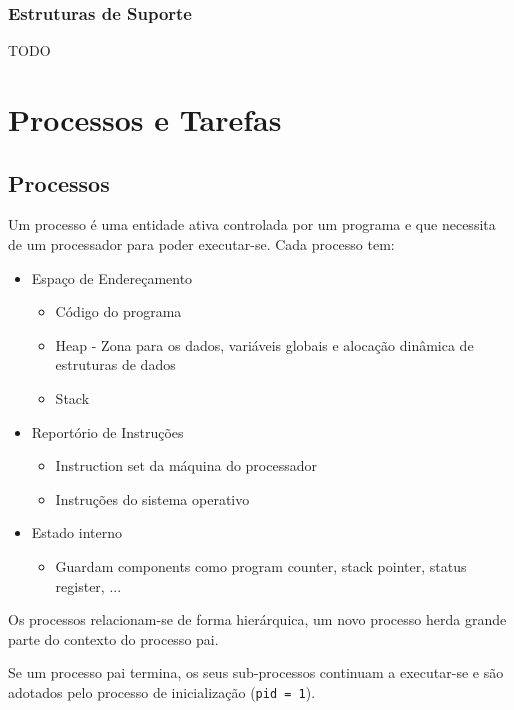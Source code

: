 \documentclass[11pt]{article}
\begin{document}
\subsubsection{Estruturas de Suporte}

TODO

\newpage

\section{Processos e Tarefas}

\subsection{Processos}

Um processo é uma entidade ativa controlada por um programa e que necessita de um processador para poder executar-se. Cada processo tem:
\begin{itemize}
    \item Espaço de Endereçamento
          \begin{itemize}
              \item Código do programa
              \item Heap - Zona para os dados, variáveis globais e alocação
                    dinâmica de estruturas de dados
              \item Stack
          \end{itemize}
    \item Reportório de Instruções
          \begin{itemize}
              \item Instruction set da máquina do processador
              \item Instruções do sistema operativo
          \end{itemize}
    \item Estado interno
          \begin{itemize}
              \item Guardam components como program counter, stack pointer, status register, ...
          \end{itemize}
\end{itemize}

Os processos relacionam-se de forma hierárquica, um novo processo herda grande parte do contexto do processo pai.

Se um processo pai termina, os seus sub-processos continuam a executar-se e são adotados pelo processo de inicialização (\lstinline|pid = 1|).
\end{document}
